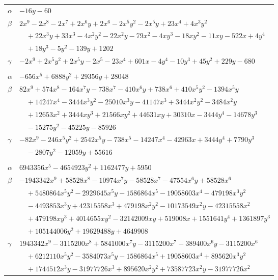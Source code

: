 \documentclass[11pt]{article}
\begin{document}
\begin{longtable}{@{}ll@{}}
$\alpha$ & $-16y-60$\\
$\beta$ & $2x^{9}-2x^{8}-2x^{7}+2x^{6}y+2x^{6}-2x^{5}y^{2}-2x^{5}y+23x^{4}+4x^{3}y^{2}$\\
 & $\quad +22x^{3}y+33x^{3}-4x^{2}y^{2}-22x^{2}y-79x^{2}-4xy^{3}-18xy^{2}-11xy-522x+4y^{4}$\\
 & $\quad +18y^{3}-5y^{2}-139y+1202$\\
$\gamma$ & $-2x^{9}+2x^{5}y^{2}+2x^{5}y-2x^{5}-23x^{4}+601x-4y^{4}-10y^{3}+45y^{2}+229y-680$\\
\addlinespace[3pt]
\multicolumn{2}{@{}l}{$\{i,j\}=\{22,30\}$, $k_{ij}=2^{6}\cdot 3\cdot 5$}\\
$\alpha$ & $-656x^{5}+6888y^{2}+29356y+28048$\\
$\beta$ & $82x^{9}+574x^{8}-164x^{7}y-738x^{7}-410x^{6}y+738x^{6}+410x^{5}y^{2}-1394x^{5}y$\\
 & $\quad +14247x^{4}-3444x^{3}y^{2}-25010x^{3}y-41147x^{3}+3444x^{2}y^{2}-3484x^{2}y$\\
 & $\quad +12653x^{2}+3444xy^{3}+21566xy^{2}+44631xy+30310x-3444y^{4}-14678y^{3}$\\
 & $\quad -15275y^{2}-45225y-85926$\\
$\gamma$ & $-82x^{9}-246x^{5}y^{2}+2542x^{5}y-738x^{5}-14247x^{4}-42963x+3444y^{4}+7790y^{3}$\\
 & $\quad -2807y^{2}-12059y+55616$\\
\addlinespace[3pt]
\multicolumn{2}{@{}l}{$\{i,j\}=\{22,33\}$, $k_{ij}=2^{3}\cdot 5^{2}\cdot 7\cdot 17$}\\
$\alpha$ & $6943356x^{5}-4654923y^{2}+1162477y+5950$\\
$\beta$ & $-1943342x^{9}+58528x^{8}-10974x^{7}y-58528x^{7}-47554x^{6}y+58528x^{6}$\\
 & $\quad +5480864x^{5}y^{2}-2929645x^{5}y-1586864x^{5}-19058603x^{4}-479198x^{3}y^{2}$\\
 & $\quad -4493853x^{3}y+42315558x^{3}+479198x^{2}y^{2}-10173549x^{2}y-42315558x^{2}$\\
 & $\quad +479198xy^{3}+4014655xy^{2}-32142009xy+519008x+1551641y^{4}+1361897y^{3}$\\
 & $\quad +105144006y^{2}+19629488y+4649908$\\
$\gamma$ & $1943342x^{9}-3115200x^{8}+5841000x^{7}y-3115200x^{7}-389400x^{6}y-3115200x^{6}$\\
 & $\quad +6212110x^{5}y^{2}-3584073x^{5}y-1586864x^{5}+19058603x^{4}+895620x^{3}y^{2}$\\
 & $\quad +1744512x^{3}y-31977726x^{3}+895620x^{2}y^{2}+73587723x^{2}y-31977726x^{2}$\\

\end{longtable}
\end{document}
